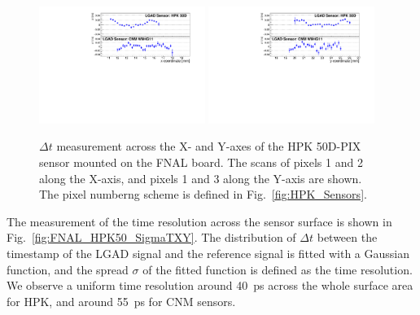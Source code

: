 \documentclass[preprint,1p]{elsarticle}
\begin{document}
\begin{figure}[htbp] 
\centering
\includegraphics[width=0.48\textwidth]{figs/HPK50DVsCNM_MeanTime_vs_X.pdf}
\includegraphics[width=0.48\textwidth]{figs/HPK50DVsCNM_MeanTime_vs_Y.pdf}
\caption{$\Delta t$ measurement across the X- and Y-axes of the HPK 50D-PIX sensor 
mounted on the FNAL board. The scans of pixels 1 and 2 along the X-axis, and 
pixels 1 and 3 along the Y-axis are shown. The pixel numberng scheme is defined in Fig.~\ref{fig:HPK_Sensors}.} 
\label{fig:FNAL_HPK50_DTXY} 
\end{figure} 

The measurement of the time resolution across the sensor surface is shown in
Fig.~\ref{fig:FNAL_HPK50_SigmaTXY}. The distribution of $\Delta t$ between the timestamp
of the LGAD signal and the reference signal is fitted with a Gaussian function, and
the spread $\sigma$ of the fitted function is defined as
the time resolution. We observe a uniform time resolution around 40~ps across
the whole surface area for HPK, and around 55~ps for CNM sensors.
\end{document}
